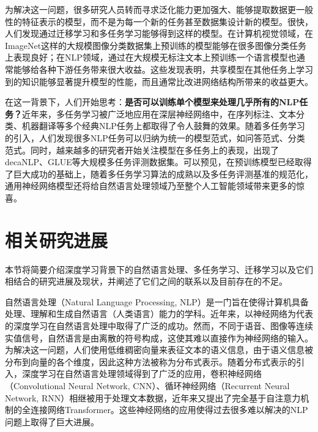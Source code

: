 为解决这一问题，很多研究人员转而寻求泛化能力更加强大、能够提取数据更一般性的特征表示的模型，而不是为每一个新的任务甚至数据集设计新的模型。很快，人们发现通过迁移学习和多任务学习能够得到这样的模型。在计算机视觉领域，在ImageNet\cite{DBLP:conf/cvpr/DengDSLL009}这样的大规模图像分类数据集上预训练的模型能够在很多图像分类任务上表现良好；在NLP领域，通过在大规模无标注文本上预训练一个语言模型也通常能够给各种下游任务带来很大收益\cite{DBLP:conf/naacl/PetersNIGCLZ18}\cite{radford2018improving}。这些发现表明，共享模型在其他任务上学习到的知识能够显著提升模型的性能，而且通常比改进网络结构所带来的收益更大。

在这一背景下，人们开始思考：\textbf{是否可以训练单个模型来处理几乎所有的NLP任务？}近年来，多任务学习被广泛地应用在深层神经网络中，在序列标注、文本分类、机器翻译等多个经典NLP任务上都取得了令人鼓舞的效果。随着多任务学习的引入，人们发现很多NLP任务可以归纳为统一的模型范式，如问答范式\cite{mccann2018natural}、分类范式\cite{radford2018improving}\cite{devlin2018bert}。同时，越来越多的研究者开始关注模型在多任务上的表现，出现了decaNLP\cite{mccann2018natural}、GLUE\cite{DBLP:conf/emnlp/WangSMHLB18}等大规模多任务评测数据集。可以预见，在预训练模型已经取得了巨大成功的基础上，随着多任务学习算法的成熟以及多任务评测基准的规范化，通用神经网络模型还将给自然语言处理领域乃至整个人工智能领域带来更多的惊喜。

\section{相关研究进展}

本节将简要介绍深度学习背景下的自然语言处理、多任务学习、迁移学习以及它们相结合的研究进展及现状，并阐述了它们之间的联系以及目前存在的不足。

自然语言处理（Natural Language Processing, NLP）是一门旨在使得计算机具备处理、理解和生成自然语言（人类语言）能力的学科。近年来，以神经网络为代表的深度学习在自然语言处理\cite{DBLP:journals/jmlr/CollobertWBKKK11}\cite{DBLP:conf/emnlp/BordesCW14}\cite{DBLP:conf/acl/JeanCMB15}\cite{DBLP:conf/nips/SutskeverVL14}中取得了广泛的成功。然而，不同于语音、图像等连续实值信号，自然语言是由离散的符号构成，这使其难以直接作为神经网络的输入。为解决这一问题，人们使用低维稠密向量来表征文本的语义信息\cite{DBLP:conf/nips/MikolovSCCD13}\cite{DBLP:conf/emnlp/PenningtonSM14}，由于语义信息被分布到向量的各个维度，因此这种方法被称为分布式表示。随着分布式表示的引入，深度学习在自然语言处理领域得到了广泛的应用，卷积神经网络（Convolutional Neural Network, CNN）、循环神经网络（Recurrent Neural Network, RNN）相继被用于处理文本数据，近年来又提出了完全基于自注意力机制的全连接网络Transformer。这些神经网络的应用使得过去很多难以解决的NLP问题上取得了巨大进展。

